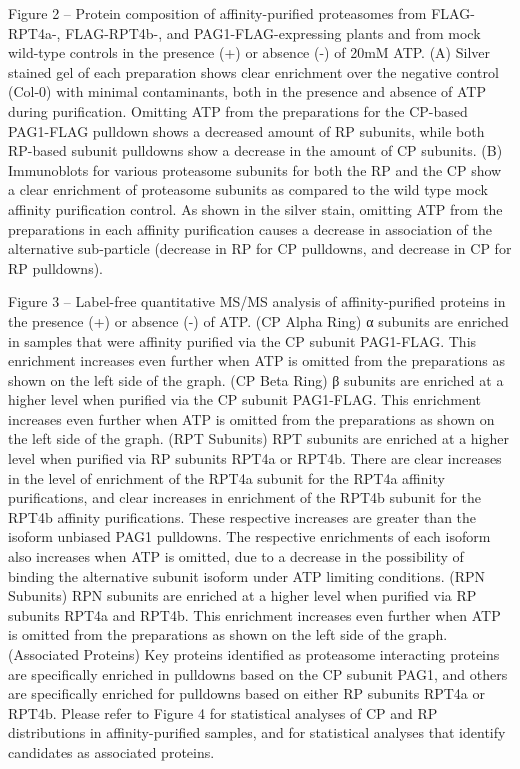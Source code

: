 Figure 2 – Protein composition of affinity-purified proteasomes from FLAG-RPT4a-, FLAG-RPT4b-, and PAG1-FLAG-expressing plants and from mock wild-type controls in the presence (+) or absence (-) of 20mM ATP. (A) Silver stained gel of each preparation shows clear enrichment over the negative control (Col-0) with minimal contaminants, both in the presence and absence of ATP during purification. Omitting ATP from the preparations for the CP-based PAG1-FLAG pulldown shows a decreased amount of RP subunits, while both RP-based subunit pulldowns show a decrease in the amount of CP subunits. (B) Immunoblots for various proteasome subunits for both the RP and the CP show a clear enrichment of proteasome subunits as compared to the wild type mock affinity purification control.  As shown in the silver stain, omitting ATP from the preparations in each affinity purification causes a decrease in association of the alternative sub-particle (decrease in RP for CP pulldowns, and decrease in CP for RP pulldowns).

Figure 3 – Label-free quantitative MS/MS analysis of affinity-purified proteins in the presence (+) or absence (-) of ATP. (CP Alpha Ring) α subunits are enriched in samples that were affinity purified via the CP subunit PAG1-FLAG. This enrichment increases even further when ATP is omitted from the preparations as shown on the left side of the graph. (CP Beta Ring) β subunits are enriched at a higher level when purified via the CP subunit PAG1-FLAG. This enrichment increases even further when ATP is omitted from the preparations as shown on the left side of the graph. (RPT Subunits) RPT subunits are enriched at a higher level when purified via RP subunits RPT4a or RPT4b. There are clear increases in the level of enrichment of the RPT4a subunit for the RPT4a affinity purifications, and clear increases in enrichment of the RPT4b subunit for the RPT4b affinity purifications. These respective increases are greater than the isoform unbiased PAG1 pulldowns. The respective enrichments of each isoform also increases when ATP is omitted, due to a decrease in the possibility of binding the alternative subunit isoform under ATP limiting conditions. (RPN Subunits) RPN subunits are enriched at a higher level when purified via RP subunits RPT4a and RPT4b. This enrichment increases even further when ATP is omitted from the preparations as shown on the left side of the graph. (Associated Proteins) Key proteins identified as proteasome interacting proteins are specifically enriched in pulldowns based on the CP subunit PAG1, and others are specifically enriched for pulldowns based on either RP subunits RPT4a or RPT4b. Please refer to Figure 4 for statistical analyses of CP and RP distributions in affinity-purified samples, and for statistical analyses that identify candidates as associated proteins. 


